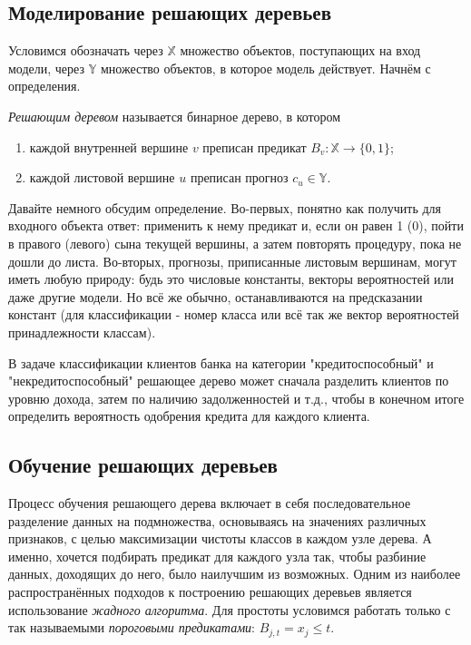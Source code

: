 \begin{itemize}
\subsection{Моделирование решающих деревьев}
Условимся обозначать через $\mathbb{X}$ множество объектов, поступающих на вход модели, через $\mathbb{Y}$ множество объектов, в которое модель действует. Начнём с определения.
\begin{definition}
    \textit{Решающим деревом} называется бинарное дерево, в котором
    \begin{enumerate}
        \item каждой внутренней вершине $v$ преписан предикат $B_v: \mathbb{X} \to \{0, 1\}$;
        \item каждой листовой вершине $u$ преписан прогноз $c_u \in \mathbb{Y}$.
    \end{enumerate}
\end{definition}

Давайте немного обсудим определение. Во-первых, понятно как получить для входного объекта ответ: применить к нему предикат и, если он равен 1 (0), пойти в правого (левого) сына текущей вершины, а затем повторять процедуру, пока не дошли до листа. Во-вторых, прогнозы, приписанные листовым вершинам, могут иметь любую природу: будь это числовые константы, векторы вероятностей или даже другие модели. Но всё же обычно, останавливаются на предсказании констант (для классификации - номер класса или всё так же вектор вероятностей принадлежности классам).

\begin{example}
    В задаче классификации клиентов банка на категории "кредитоспособный" и "некредитоспособный" решающее дерево может сначала разделить клиентов по уровню дохода, затем по наличию задолженностей и т.д., чтобы в конечном итоге определить вероятность одобрения кредита для каждого клиента.
\end{example}

\subsection{Обучение решающих деревьев}
Процесс обучения решающего дерева включает в себя последовательное разделение данных на подмножества, основываясь на значениях различных признаков, с целью максимизации чистоты классов в каждом узле дерева. А именно, хочется подбирать предикат для каждого узла так, чтобы разбиние данных, доходящих до него, было наилучшим из возможных. Одним из наиболее распространённых подходов к построению решающих деревьев является использование \textit{жадного алгоритма}. Для простоты условимся работать только с так называемыми \textit{пороговыми предикатами}: $B_{j, t} = x_j \leq t$.


\end{itemize}

